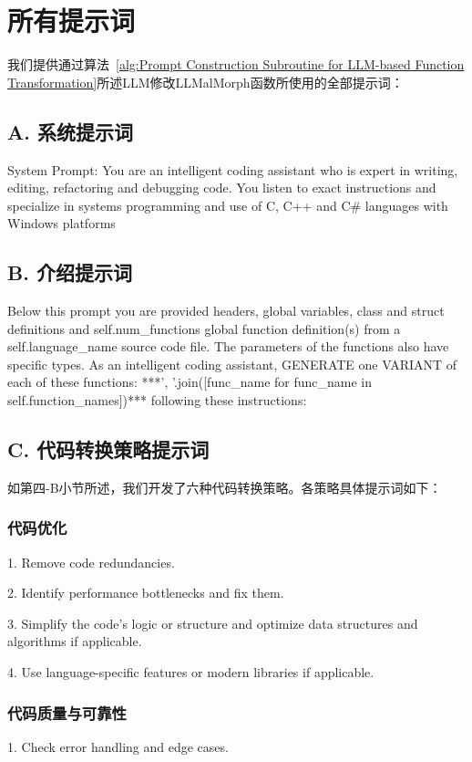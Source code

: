 \chapter{所有提示词}


我们提供通过算法~\ref{alg:Prompt Construction Subroutine for LLM-based Function Transformation}所述LLM修改LLMalMorph函数所使用的全部提示词：
\section{A. 系统提示词}
System Prompt: You are an intelligent coding assistant who is expert in writing, editing, refactoring and debugging code. You listen to exact instructions and specialize in systems programming and use of C, C++ and C\# languages with Windows platforms

\section{B. 介绍提示词}
Below this prompt you are provided headers, global variables, class and struct definitions and self.num\_functions global function definition(s) from a self.language\_name source code file. The parameters of the functions also have specific types. As an intelligent coding assistant, GENERATE one VARIANT of each of these functions: ***’, ’.join([func\_name for func\_name in self.function\_names])*** following these instructions:

\section{C. 代码转换策略提示词}
如第四-B小节所述，我们开发了六种代码转换策略。各策略具体提示词如下：

\subsection{代码优化}
1. Remove code redundancies.

2. Identify performance bottlenecks and fix them.

3. Simplify the code’s logic or structure and optimize data structures and algorithms if applicable.

4. Use language-specific features or modern libraries if applicable.

\subsection{代码质量与可靠性}
1. Check error handling and edge cases.

